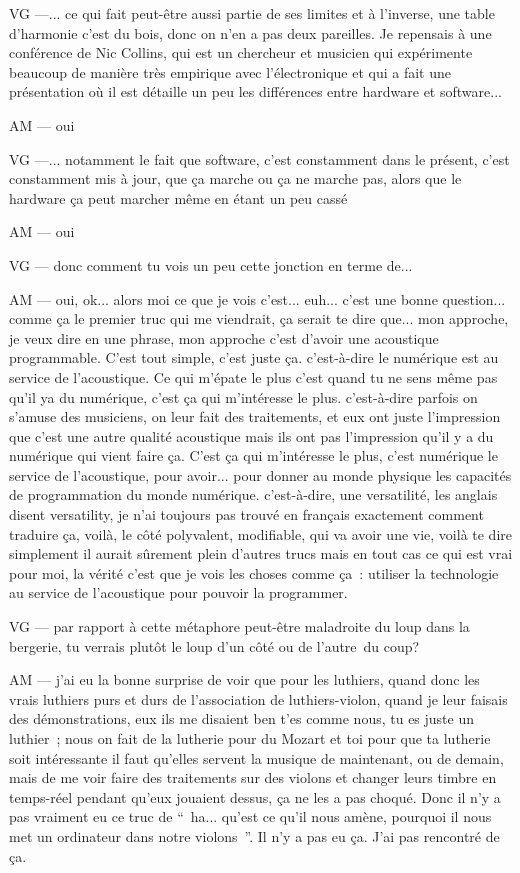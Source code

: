 VG —... ce qui fait peut-être aussi partie de ses limites et à l'inverse, une table d'harmonie c'est du bois, donc on n'en a pas deux pareilles. Je repensais à une conférence de Nic Collins, qui est un chercheur et musicien qui expérimente beaucoup de manière très empirique avec l'électronique et qui a fait une présentation où il est détaille un peu les différences entre hardware et software... 

AM — oui 

VG —... notamment le fait que software, c'est constamment dans le présent, c'est constamment mis à jour, que ça marche ou ça ne marche pas, alors que le hardware ça peut marcher même en étant un peu cassé

AM — oui

VG — donc comment tu vois un peu cette jonction en terme de... 

AM — oui, ok... alors moi ce que je vois c'est... euh... c'est une bonne question... comme ça le premier truc qui me viendrait, ça serait te dire que... mon approche, je veux dire en une phrase, mon approche c'est d'avoir une acoustique programmable. C'est tout simple, c'est juste ça. c'est-à-dire le numérique est au service de l'acoustique. Ce qui m'épate le plus c'est quand tu ne sens même pas qu'il ya du numérique, c'est ça qui m'intéresse le plus. c'est-à-dire parfois on s'amuse des musiciens, on leur fait des traitements, et eux ont juste l'impression que c'est une autre qualité acoustique mais ils ont pas l'impression qu'il y a du numérique qui vient faire ça. C'est ça qui m'intéresse le plus, c'est numérique le service de l'acoustique, pour avoir... pour donner au monde physique les capacités de programmation du monde numérique. c'est-à-dire, une versatilité, les anglais disent versatility, je n'ai toujours pas trouvé en français exactement comment traduire ça, voilà, le côté polyvalent, modifiable, qui va avoir une vie, voilà te dire simplement il aurait sûrement plein d'autres trucs mais en tout cas ce qui est vrai pour moi, la vérité c'est que je vois les choses comme ça : utiliser la technologie au service de l'acoustique pour pouvoir la programmer.

VG — par rapport à cette métaphore peut-être maladroite du loup dans la bergerie, tu verrais plutôt le loup d'un côté ou de l'autre du coup?

AM — j'ai eu la bonne surprise de voir que pour les luthiers, quand donc les vrais luthiers purs et durs de l'association de luthiers-violon, quand je leur faisais des démonstrations, eux ils me disaient ben t'es comme nous, tu es juste un luthier ; nous on fait de la lutherie pour du Mozart et toi pour que ta lutherie soit intéressante il faut qu'elles servent la musique de maintenant, ou  de demain, mais de me voir faire des traitements sur des violons et changer leurs timbre en temps-réel pendant qu'eux jouaient dessus, ça ne les a pas choqué. Donc il n'y a pas vraiment eu ce truc de “ ha... qu'est ce qu'il nous amène, pourquoi il nous met un ordinateur dans notre violons ”. Il n'y a pas eu ça. J'ai pas rencontré de ça. 

